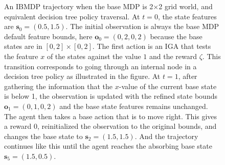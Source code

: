 \begin{figure}[h]
\caption{An IBMDP trajectory when the base MDP is 2$\times$2 grid world, and equivalent decision tree policy traversal. 
At $t=0$, the state features are $\boldsymbol{s}_0 = (0.5, 1.5)$. 
The initial observation is always the base MDP default feature bounds, here $\boldsymbol{o}_0=(0, 2, 0, 2)$ because the base states are in $[0, 2] \times [0, 2]$.
The first action is an IGA that tests the feature $x$ of the states against the value $1$ and the reward $\zeta$. 
This transition corresponds to going through an internal node in a decision tree policy as illustrated in the figure. 
At $t=1$, after gathering the information that the $x$-value of the current base state is below 1, the observation is updated with the refined state bounds $\boldsymbol{o}_1=(0, 1, 0, 2)$ and the base state features remains unchanged. The agent then takes a base action that is to move right. 
This gives a reward 0, reinitialized the observation to the original bounds, and changes the base state to $\boldsymbol{s}_2=(1.5, 1.5)$. And the trajectory continues like this until the agent reaches the absorbing base state $\boldsymbol{s}_5=(1.5, 0.5)$.}
\label{fig:poibmdp_trajectory}
\end{figure}

